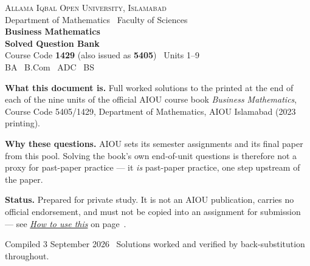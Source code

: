 \begin{titlepage}
\thispagestyle{empty}

\vspace*{1.3cm}
{\sffamily\color{white}
  {\rmfamily\scshape\lsstyle\large Allama Iqbal Open University, Islamabad}\\[3pt]
  {\footnotesize Department of Mathematics \textbullet\ Faculty of Sciences}\\[24pt]
  {\Huge\bfseries Business Mathematics}\\[10pt]
  {\LARGE\bfseries Solved Question Bank}\\[16pt]
  {\large Course Code \textbf{1429} (also issued as \textbf{5405}) \textbullet\ Units 1--9}\\[6pt]
  {\normalsize BA \textbullet\ B.Com \textbullet\ ADC \textbullet\ BS}
}

\vspace{4.1cm}

\begin{tcolorbox}[enhanced, colback=bmtint, colframe=bmblue, boxrule=0.6pt,
                  arc=3pt, left=14pt, right=14pt, top=12pt, bottom=12pt]
\sffamily\small
\textbf{\color{bmblue}What this document is.} Full worked solutions to the
 printed at the end of each of the nine units of
the official AIOU course book \emph{Business Mathematics}, Course Code 5405/1429,
Department of Mathematics, AIOU Islamabad (2023 printing).

\medskip
\textbf{\color{bmblue}Why these questions.} AIOU sets its semester assignments and
its final paper from this pool. Solving the book's own end-of-unit questions is
therefore not a proxy for past-paper practice --- it \emph{is} past-paper practice,
one step upstream of the paper.

\medskip
\textbf{\color{bmblue}Status.} Prepared for private study. It is not an AIOU
publication, carries no official endorsement, and must not be copied into an
assignment for submission --- see \hyperref[sec:howtouse]{\emph{How to use this}}
on page~\pageref{sec:howtouse}.
\end{tcolorbox}

\vfill
{\sffamily\footnotesize\color{bmgrey}
Compiled 3 September 2026 \textbullet\ Solutions worked and verified by
back-substitution throughout.\par}
\end{titlepage}

